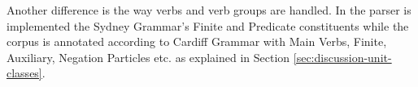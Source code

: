 

Another difference is the way verbs and verb groups are handled. In the parser is implemented the Sydney Grammar's Finite and Predicate constituents while the corpus is annotated according to Cardiff Grammar with Main Verbs, Finite, Auxiliary, Negation Particles etc. as explained in Section \ref{sec:discussion-unit-classes}. %


	
